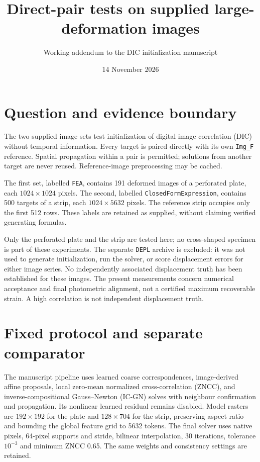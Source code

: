 \documentclass[11pt,a4paper]{article}
\title{Direct-pair tests on supplied large-deformation images}
\author{Working addendum to the DIC initialization manuscript}
\date{14 November 2026}
\begin{document}
\maketitle
\section{Question and evidence boundary}
The two supplied image sets test initialization of digital image correlation (DIC) without temporal information. Every target is paired directly with its own \texttt{Img\_F} reference. Spatial propagation within a pair is permitted; solutions from another target are never reused. Reference-image preprocessing may be cached.

The first set, labelled \texttt{FEA}, contains 191 deformed images of a perforated plate, each $1024\times1024$ pixels. The second, labelled \texttt{ClosedFormExpression}, contains 500 targets of a strip, each $1024\times5632$ pixels. The reference strip occupies only the first 512 rows. These labels are retained as supplied, without claiming verified generating formulas.

Only the perforated plate and the strip are tested here; no cross-shaped specimen is part of these experiments. The separate \texttt{DEPL} archive is excluded: it was not used to generate initialization, run the solver, or score displacement errors for either image series. No independently associated displacement truth has been established for these images. The present measurements concern numerical acceptance and final photometric alignment, not a certified maximum recoverable strain. A high correlation is not independent displacement truth.

\section{Fixed protocol and separate comparator}
The manuscript pipeline uses learned coarse correspondences, image-derived affine proposals, local zero-mean normalized cross-correlation (ZNCC), and inverse-compositional Gauss--Newton (IC-GN) solves with neighbour confirmation and propagation. Its nonlinear learned residual remains disabled. Model rasters are $192\times192$ for the plate and $128\times704$ for the strip, preserving aspect ratio and bounding the global feature grid to 5632 tokens. The final solver uses native pixels, 64-pixel supports and stride, bilinear interpolation, 30 iterations, tolerance $10^{-3}$ and minimum ZNCC 0.65. The same weights and consistency settings are retained.
\end{document}

